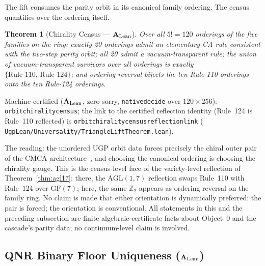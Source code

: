 \documentclass[11pt]{article}
\newtheorem{theorem}{Theorem}[section]
\theoremstyle{remark}
\newcommand{\GF}[1]{\ensuremath{\mathrm{GF}(#1)}}
\newcommand{\lean}[1]{%
  \penalty-100
  \begingroup\def\_{\textunderscore\allowbreak}\texttt{#1}\endgroup}
\newcommand{\CatAL}{\texorpdfstring{\ensuremath{\textbf{A}_{\rm Lean}}}{A-Lean}}
\begin{document}
The lift consumes the parity orbit in its canonical family ordering. The
census quantifies over the ordering itself.

\begin{theorem}[Chirality Census --- \CatAL{}]
\label{thm:chiralitycensus}
Over all $5! = 120$ orderings of the five families on the ring: exactly
20 orderings admit an elementary CA rule consistent with the two-step
parity orbit; all 20 admit a vacuum-transparent rule; the union of
vacuum-transparent survivors over all orderings is exactly
$\{\text{Rule~110},\, \text{Rule~124}\}$; and ordering reversal bijects
the ten Rule-110 orderings onto the ten Rule-124 orderings.
\end{theorem}

{\sloppy\noindent Machine-certified (\CatAL{}, zero sorry,
\lean{native\_decide} over $120 \times 256$):
\lean{orbit\_chirality\_census}; the link to the certified reflection
identity (Rule~124 is Rule~110 reflected) is
\lean{orbit\_chirality\_census\_reflection\_link}
(\lean{UgpLean/Universality/TriangleLiftTheorem.lean}).\par}

The reading: the unordered UGP orbit data forces precisely the chiral
outer pair of the CMCA architecture~\cite{SpivackCMCA,
SpivackThreeTapeCMCA}, and choosing the canonical ordering is choosing
the chirality gauge. This is the census-level face of the variety-level
reflection of Theorem~\ref{thm:agl17}: there, the $\mathrm{AGL}(1,7)$
reflection swaps Rule~110 with Rule~124 over $\GF{7}$; here, the same
$\mathbb{Z}_2$ appears as ordering reversal on the family ring. No claim
is made that either orientation is dynamically preferred: the pair is
forced; the orientation is conventional. All statements in this and the
preceding subsection are finite algebraic-certificate facts about
Object~0 and the cascade's parity data; no continuum-level claim is
involved.

\subsection{QNR Binary Floor Uniqueness (\CatAL{})}
\end{document}

